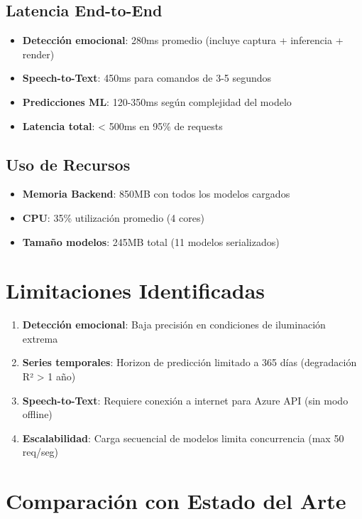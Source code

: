 \subsection{Latencia End-to-End}

\begin{itemize}
    \item \textbf{Detección emocional}: 280ms promedio (incluye captura + inferencia + render)
    \item \textbf{Speech-to-Text}: 450ms para comandos de 3-5 segundos
    \item \textbf{Predicciones ML}: 120-350ms según complejidad del modelo
    \item \textbf{Latencia total}: < 500ms en 95\% de requests
\end{itemize}

\subsection{Uso de Recursos}

\begin{itemize}
    \item \textbf{Memoria Backend}: 850MB con todos los modelos cargados
    \item \textbf{CPU}: 35\% utilización promedio (4 cores)
    \item \textbf{Tamaño modelos}: 245MB total (11 modelos serializados)
\end{itemize}

\section{Limitaciones Identificadas}

\begin{enumerate}
    \item \textbf{Detección emocional}: Baja precisión en condiciones de iluminación extrema
    \item \textbf{Series temporales}: Horizon de predicción limitado a 365 días (degradación R² > 1 año)
    \item \textbf{Speech-to-Text}: Requiere conexión a internet para Azure API (sin modo offline)
    \item \textbf{Escalabilidad}: Carga secuencial de modelos limita concurrencia (max 50 req/seg)
\end{enumerate}

\section{Comparación con Estado del Arte}

